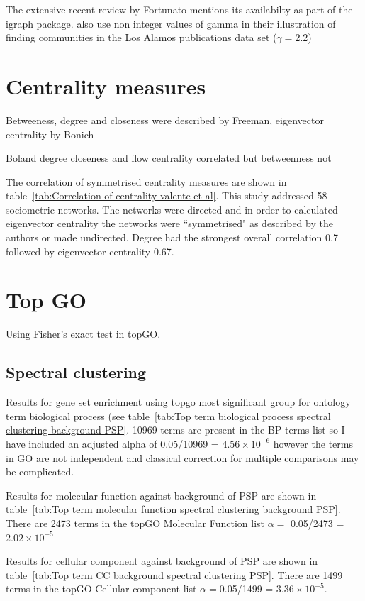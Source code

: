The extensive recent review by Fortunato \cite{fortunato2016community} mentions its availabilty as part of the igraph package.  \cite{reichardt2006statistical} also use non integer values of gamma in their illustration of finding communities in the Los Alamos publications data set ($\gamma=$2.2)



\section{Centrality measures}
Betweeness, degree and closeness were described by Freeman, eigenvector centrality by Bonich \cite{valente2008correlated}

Boland degree closeness and flow centrality correlated but betweenness not

The correlation of symmetrised centrality measures are shown in table~\ref{tab:Correlation of centrality valente et al}. This study addressed 58 sociometric networks. The networks were directed and in order to calculated eigenvector centrality the networks were ``symmetrised" as described by the authors or made undirected. Degree had the strongest overall correlation 0.7 followed by eigenvector centrality 0.67.

\section{Top GO}
Using Fisher's exact test in topGO.
\subsection{Spectral clustering}

Results for gene set enrichment using topgo most significant group for ontology term biological process (see table~\ref{tab:Top term biological process spectral clustering background PSP}. 10969 terms are present in the BP terms list so I have included an adjusted alpha of 0.05/10969 = $4.56 \times 10^{-6}$ however the terms in GO are not independent and classical correction for multiple comparisons may be complicated. 

Results for molecular function against background of PSP are shown in table~\ref{tab:Top term molecular function spectral clustering background PSP}. There are 2473 terms in the topGO Molecular Function list $\alpha=$ 0.05/2473 = $2.02 \times 10^{-5}$

Results for cellular component against background of PSP are shown in table~\ref{tab:Top term CC background spectral clustering PSP}. There are 1499 terms in the topGO Cellular component list $\alpha=$0.05/1499 = $3.36 \times 10^{-5}$.


